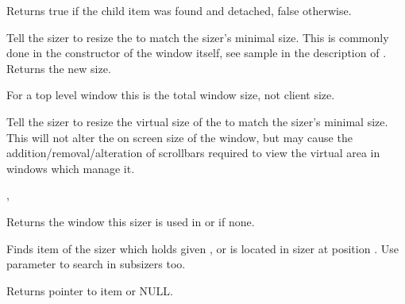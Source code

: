 Returns true if the child item was found and detached, false otherwise.




\label{wxsizerfit}


Tell the sizer to resize the  to match the sizer's minimal size. This
is commonly done in the constructor of the window itself, see sample in the description
of . Returns the new size.

For a top level window this is the total window size, not client size.


\label{wxsizerfitinside}


Tell the sizer to resize the virtual size of the  to match the sizer's
minimal size.  This will not alter the on screen size of the window, but may cause
the addition/removal/alteration of scrollbars required to view the virtual area in
windows which manage it.


,\rtfsp
{}


\label{wxsizergetcontainingwindow}


Returns the window this sizer is used in or \NULL if none.


\label{wxsizergetitem}




Finds item of the sizer which holds given ,  or is located
in sizer at position .
Use parameter  to search in subsizers too.

Returns pointer to item or NULL.


